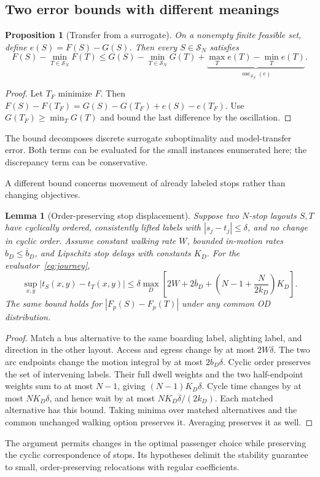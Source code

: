 \documentclass[11pt]{article}
\newtheorem{proposition}[theorem]{Proposition}
\newtheorem{lemma}[theorem]{Lemma}
\theoremstyle{remark}\newtheorem{remark}[theorem]{Remark}
\newcommand{\Sset}{\mathcal S_N}
\newcommand{\osc}{\operatorname{osc}}
\begin{document}
\subsection{Two error bounds with different meanings}
\begin{proposition}[Transfer from a surrogate]\label{prop:transfer}
On a nonempty finite feasible set, define $e(S)=F(S)-G(S)$. Then every $S\in\Sset$ satisfies
\begin{equation}
F(S)-\min_{T\in\Sset}F(T)
\leq G(S)-\min_{T\in\Sset}G(T)
+\underbrace{\max_T e(T)-\min_T e(T)}_{\osc_{\Sset}(e)}.\label{eq:transfer}
\end{equation}
\end{proposition}
\begin{proof}
Let $T_F$ minimize $F$. Then
$F(S)-F(T_F)=G(S)-G(T_F)+e(S)-e(T_F)$.
Use $G(T_F)\geq\min_TG(T)$ and bound the last difference by the oscillation.
\end{proof}
The bound decomposes discrete surrogate suboptimality and model-transfer error. Both terms can be evaluated for the small instances enumerated here; the discrepancy term can be conservative.

A different bound concerns movement of already labeled stops rather than changing objectives.
\begin{lemma}[Order-preserving stop displacement]\label{lem:snap}
Suppose two $N$-stop layouts $S,T$ have cyclically ordered, consistently lifted labels with $|s_j-t_j|\leq\delta$, and no change in cyclic order. Assume constant walking rate $W$, bounded in-motion rates $b_D\leq\overline b_D$, and Lipschitz stop delays with constants $K_D$. For the evaluator~\eqref{eq:journey},
\begin{equation}
\sup_{x,y}|t_S(x,y)-t_T(x,y)|
\leq\delta\max_D\left[2W+2\overline b_D+
\left(N-1+\frac{N}{2k_D}\right)K_D\right].\label{eq:snap}
\end{equation}
The same bound holds for $|F_p(S)-F_p(T)|$ under any common OD distribution.
\end{lemma}
\begin{proof}
Match a bus alternative to the same boarding label, alighting label, and direction in the other layout. Access and egress change by at most $2W\delta$. The two arc endpoints change the motion integral by at most $2\overline b_D\delta$. Cyclic order preserves the set of intervening labels. Their full dwell weights and the two half-endpoint weights sum to at most $N-1$, giving $(N-1)K_D\delta$. Cycle time changes by at most $NK_D\delta$, and hence wait by at most $NK_D\delta/(2k_D)$. Each matched alternative has this bound. Taking minima over matched alternatives and the common unchanged walking option preserves it. Averaging preserves it as well.
\end{proof}
The argument permits changes in the optimal passenger choice while preserving the cyclic correspondence of stops. Its hypotheses delimit the stability guarantee to small, order-preserving relocations with regular coefficients.
\end{document}
